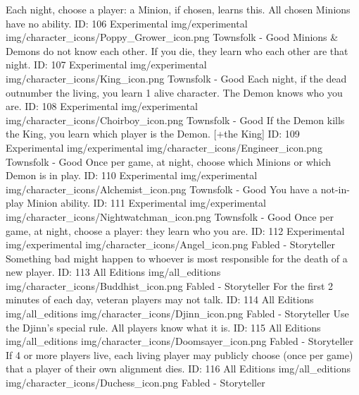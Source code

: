 	{Each night, choose a player: a Minion, if chosen, learns this. All chosen Minions have no ability.}        
	{ID: 106}
	{Experimental}
	{img/experimental}
	{img/character_icons/Poppy_Grower_icon.png}
	{\color{goodcolor}Townsfolk - Good}
	{Minions \& Demons do not know each other. If you die, they learn who each other are that night.}        
	{ID: 107}
	{Experimental}
	{img/experimental}
	{img/character_icons/King_icon.png}
	{\color{goodcolor}Townsfolk - Good}
	{Each night, if the dead outnumber the living, you learn 1 alive character. The Demon knows who you are.}        
	{ID: 108}
	{Experimental}
	{img/experimental}
	{img/character_icons/Choirboy_icon.png}
	{\color{goodcolor}Townsfolk - Good}
	{If the Demon kills the King, you learn which player is the Demon. [+the King]}        
	{ID: 109}
	{Experimental}
	{img/experimental}
	{img/character_icons/Engineer_icon.png}
	{\color{goodcolor}Townsfolk - Good}
	{Once per game, at night, choose which Minions or which Demon is in play.}        
	{ID: 110}
	{Experimental}
	{img/experimental}
	{img/character_icons/Alchemist_icon.png}
	{\color{goodcolor}Townsfolk - Good}
	{You have a not-in-play Minion ability.}        
	{ID: 111}
	{Experimental}
	{img/experimental}
	{img/character_icons/Nightwatchman_icon.png}
	{\color{goodcolor}Townsfolk - Good}
	{Once per game, at night, choose a player: they learn who you are.}        
	{ID: 112}
	{Experimental}
	{img/experimental}
	{img/character_icons/Angel_icon.png}
	{\color{storytellercolor}Fabled - Storyteller}
	{Something bad might happen to whoever is most responsible for the death of a new player.}        
	{ID: 113}
	{All Editions}
	{img/all_editions}
	{img/character_icons/Buddhist_icon.png}
	{\color{storytellercolor}Fabled - Storyteller}
	{For the first 2 minutes of each day, veteran players may not talk.}        
	{ID: 114}
	{All Editions}
	{img/all_editions}
	{img/character_icons/Djinn_icon.png}
	{\color{storytellercolor}Fabled - Storyteller}
	{Use the Djinn's special rule. All players know what it is.}        
	{ID: 115}
	{All Editions}
	{img/all_editions}
	{img/character_icons/Doomsayer_icon.png}
	{\color{storytellercolor}Fabled - Storyteller}
	{If 4 or more players live, each living player may publicly choose (once per game) that a player of their own alignment dies.}        
	{ID: 116}
	{All Editions}
	{img/all_editions}
	{img/character_icons/Duchess_icon.png}
	{\color{storytellercolor}Fabled - Storyteller}
